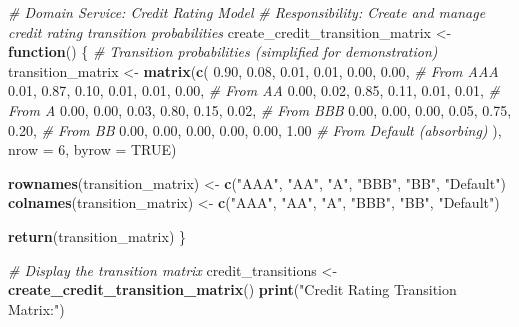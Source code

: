 \documentclass[
]{article}
\newenvironment{Shaded}{\begin{snugshade}}{\end{snugshade}}
\newcommand{\AttributeTok}[1]{\textcolor[rgb]{0.13,0.29,0.53}{#1}}
\newcommand{\CommentTok}[1]{\textcolor[rgb]{0.56,0.35,0.01}{\textit{#1}}}
\newcommand{\ConstantTok}[1]{\textcolor[rgb]{0.56,0.35,0.01}{#1}}
\newcommand{\ControlFlowTok}[1]{\textcolor[rgb]{0.13,0.29,0.53}{\textbf{#1}}}
\newcommand{\DecValTok}[1]{\textcolor[rgb]{0.00,0.00,0.81}{#1}}
\newcommand{\FloatTok}[1]{\textcolor[rgb]{0.00,0.00,0.81}{#1}}
\newcommand{\FunctionTok}[1]{\textcolor[rgb]{0.13,0.29,0.53}{\textbf{#1}}}
\newcommand{\NormalTok}[1]{#1}
\newcommand{\OtherTok}[1]{\textcolor[rgb]{0.56,0.35,0.01}{#1}}
\newcommand{\StringTok}[1]{\textcolor[rgb]{0.31,0.60,0.02}{#1}}
\begin{document}
\begin{Shaded}
\begin{Highlighting}[]
\CommentTok{\# Domain Service: Credit Rating Model}
\CommentTok{\# Responsibility: Create and manage credit rating transition probabilities}
\NormalTok{create\_credit\_transition\_matrix }\OtherTok{\textless{}{-}} \ControlFlowTok{function}\NormalTok{() \{}
  \CommentTok{\# Transition probabilities (simplified for demonstration)}
\NormalTok{  transition\_matrix }\OtherTok{\textless{}{-}} \FunctionTok{matrix}\NormalTok{(}\FunctionTok{c}\NormalTok{(}
    \FloatTok{0.90}\NormalTok{, }\FloatTok{0.08}\NormalTok{, }\FloatTok{0.01}\NormalTok{, }\FloatTok{0.01}\NormalTok{, }\FloatTok{0.00}\NormalTok{, }\FloatTok{0.00}\NormalTok{,  }\CommentTok{\# From AAA}
    \FloatTok{0.01}\NormalTok{, }\FloatTok{0.87}\NormalTok{, }\FloatTok{0.10}\NormalTok{, }\FloatTok{0.01}\NormalTok{, }\FloatTok{0.01}\NormalTok{, }\FloatTok{0.00}\NormalTok{,  }\CommentTok{\# From AA  }
    \FloatTok{0.00}\NormalTok{, }\FloatTok{0.02}\NormalTok{, }\FloatTok{0.85}\NormalTok{, }\FloatTok{0.11}\NormalTok{, }\FloatTok{0.01}\NormalTok{, }\FloatTok{0.01}\NormalTok{,  }\CommentTok{\# From A}
    \FloatTok{0.00}\NormalTok{, }\FloatTok{0.00}\NormalTok{, }\FloatTok{0.03}\NormalTok{, }\FloatTok{0.80}\NormalTok{, }\FloatTok{0.15}\NormalTok{, }\FloatTok{0.02}\NormalTok{,  }\CommentTok{\# From BBB}
    \FloatTok{0.00}\NormalTok{, }\FloatTok{0.00}\NormalTok{, }\FloatTok{0.00}\NormalTok{, }\FloatTok{0.05}\NormalTok{, }\FloatTok{0.75}\NormalTok{, }\FloatTok{0.20}\NormalTok{,  }\CommentTok{\# From BB}
    \FloatTok{0.00}\NormalTok{, }\FloatTok{0.00}\NormalTok{, }\FloatTok{0.00}\NormalTok{, }\FloatTok{0.00}\NormalTok{, }\FloatTok{0.00}\NormalTok{, }\FloatTok{1.00}   \CommentTok{\# From Default (absorbing)}
\NormalTok{  ), }\AttributeTok{nrow =} \DecValTok{6}\NormalTok{, }\AttributeTok{byrow =} \ConstantTok{TRUE}\NormalTok{)}
  
  \FunctionTok{rownames}\NormalTok{(transition\_matrix) }\OtherTok{\textless{}{-}} \FunctionTok{c}\NormalTok{(}\StringTok{"AAA"}\NormalTok{, }\StringTok{"AA"}\NormalTok{, }\StringTok{"A"}\NormalTok{, }\StringTok{"BBB"}\NormalTok{, }\StringTok{"BB"}\NormalTok{, }\StringTok{"Default"}\NormalTok{)}
  \FunctionTok{colnames}\NormalTok{(transition\_matrix) }\OtherTok{\textless{}{-}} \FunctionTok{c}\NormalTok{(}\StringTok{"AAA"}\NormalTok{, }\StringTok{"AA"}\NormalTok{, }\StringTok{"A"}\NormalTok{, }\StringTok{"BBB"}\NormalTok{, }\StringTok{"BB"}\NormalTok{, }\StringTok{"Default"}\NormalTok{)}
  
  \FunctionTok{return}\NormalTok{(transition\_matrix)}
\NormalTok{\}}

\CommentTok{\# Display the transition matrix}
\NormalTok{credit\_transitions }\OtherTok{\textless{}{-}} \FunctionTok{create\_credit\_transition\_matrix}\NormalTok{()}
\FunctionTok{print}\NormalTok{(}\StringTok{"Credit Rating Transition Matrix:"}\NormalTok{)}
\end{Highlighting}
\end{Shaded}
\end{document}
